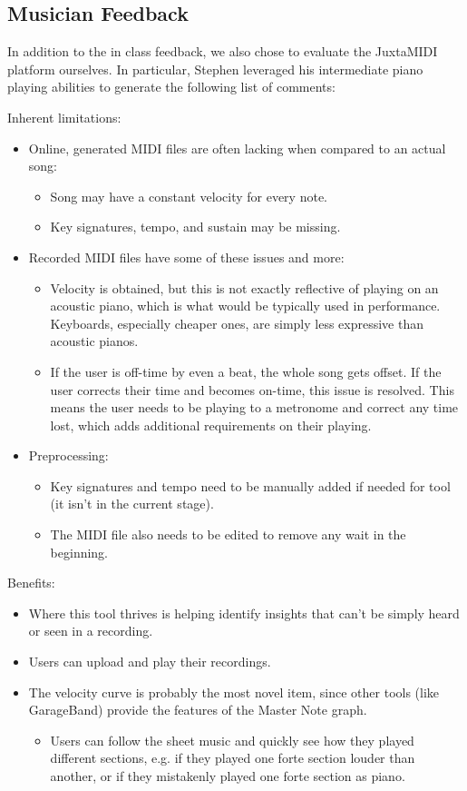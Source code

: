 \documentclass[journal]{vgtc}                %
\begin{document}
\subsection{Musician Feedback}

In addition to the in class feedback, we also chose to evaluate the JuxtaMIDI
platform ourselves. In particular, Stephen leveraged his intermediate piano
playing abilities to generate the following list of comments:

Inherent limitations:
\begin{itemize}
  \item Online, generated MIDI files are often lacking when compared to an
  actual song:
  \begin{itemize}
    \item Song may have a constant velocity for every note.
    \item Key signatures, tempo, and sustain may be missing.
  \end{itemize}
  \item Recorded MIDI files have some of these issues and more:
  \begin{itemize}
    \item Velocity is obtained, but this is not exactly reflective of playing
    on an acoustic piano, which is what would be typically used in performance.
    Keyboards, especially cheaper ones, are simply less expressive than acoustic
    pianos.
    \item If the user is off-time by even a beat, the whole song gets offset.
    If the user corrects their time and becomes on-time, this issue is resolved.
    This means the user needs to be playing to a metronome and correct any time
    lost, which adds additional requirements on their playing.
  \end{itemize}
  \item Preprocessing:
  \begin{itemize}
    \item Key signatures and tempo need to be manually added if needed for tool
    (it isn’t in the current stage).
    \item The MIDI file also needs to be edited to remove any wait in the
    beginning.
  \end{itemize}
\end{itemize}


Benefits:
\begin{itemize}
  \item Where this tool thrives is helping identify insights that can’t be
  simply heard or seen in a recording.
  \item Users can upload and play their recordings.
  \item The velocity curve is probably the most novel item, since other tools
  (like GarageBand) provide the features of the Master Note graph.
  \begin{itemize}
    \item Users can follow the sheet music and quickly see how they played
    different sections, e.g. if they played one forte section louder than
    another, or if they mistakenly played one forte section as piano.
  \end{itemize}
\end{itemize}
\end{document}
